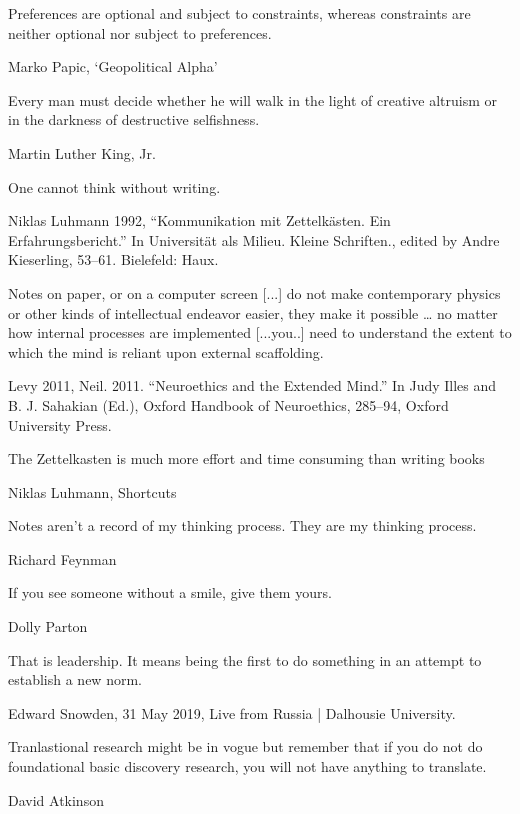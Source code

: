 \epigraph{Preferences are optional and subject to constraints, whereas constraints are neither optional nor subject to preferences.}{Marko Papic, `Geopolitical Alpha'}
\epigraph{Every man must decide whether he will walk in the light of creative altruism or in the darkness of destructive selfishness.}{Martin Luther King, Jr.}
\epigraph{One cannot think without writing.}{Niklas Luhmann 1992, ``Kommunikation mit Zettelkästen. Ein Erfahrungsbericht.'' In Universität als Milieu. Kleine Schriften., edited by Andre Kieserling, 53–61. Bielefeld: Haux.}
\epigraph{Notes on paper, or on a computer screen [...] do not make contemporary physics or other kinds of intellectual endeavor easier, they make it possible … no matter how internal processes are implemented [...you..] need to understand the extent to which the mind is reliant upon external scaffolding.}{Levy 2011, Neil. 2011. ``Neuroethics and the Extended Mind.'' In Judy Illes and B. J. Sahakian (Ed.), Oxford Handbook of Neuroethics, 285–94, Oxford University Press.}
\epigraph{The Zettelkasten is much more effort and time consuming than writing books}{Niklas Luhmann, Shortcuts}
\epigraph{Notes aren’t a record of my thinking process. They are my thinking process.}{Richard Feynman}
\epigraph{If you see someone without a smile, give them yours.}{Dolly Parton}
\epigraph{That is leadership. It means being the first to do something in an attempt to establish a new norm.}{Edward Snowden, 31 May 2019, Live from Russia | Dalhousie University.}
\epigraph{Tranlastional research might be in vogue but remember that if you do not do foundational basic discovery research, you will not have anything to translate.}{David Atkinson}
